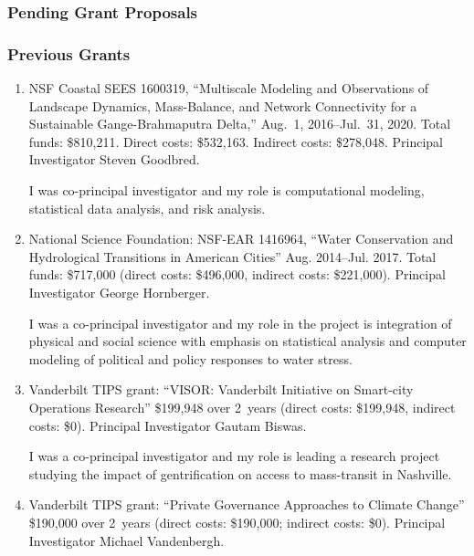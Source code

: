 \subsubsection{Pending Grant Proposals}
\begin{enumerate}
\end{enumerate}
\fi
%
\subsubsection{Previous Grants}
\begin{enumerate}
    \item NSF Coastal SEES 1600319,
    ``Multiscale Modeling and Observations of Landscape Dynamics, Mass-Balance, and Network Connectivity for a Sustainable Gange-Brahmaputra Delta,''
    Aug.~1, 2016--Jul.~31, 2020.
    Total funds: \$810,211. Direct costs: \$532,163. Indirect costs: \$278,048.
    Principal Investigator Steven Goodbred.
\begin{credit}
I was co-principal investigator and my role is computational modeling, statistical data analysis, and risk analysis.
\end{credit}
    \item National Science Foundation: NSF-EAR 1416964,
    ``Water Conservation and Hydrological Transitions in American Cities''
    Aug. 2014--Jul. 2017.
    Total funds: \$717,000 (direct costs: \$496,000, indirect costs: \$221,000).
    Principal Investigator George Hornberger.
\begin{credit}
I was a co-principal investigator and my role in the project is integration of physical and social science with emphasis on statistical analysis and
computer modeling of political and policy responses to water stress.
\end{credit}
    \item Vanderbilt TIPS grant: ``VISOR: Vanderbilt Initiative on Smart-city Operations Research'' \$199,948 over 2~years (direct costs: \$199,948, indirect costs: \$0). Principal Investigator Gautam Biswas.
\begin{credit}
I was a co-principal investigator and my role is leading a research project studying the impact of gentrification on access to mass-transit in Nashville.
\end{credit}
    \item Vanderbilt TIPS grant: ``Private Governance Approaches to Climate Change'' \$190,000 over 2~years (direct costs: \$190,000; indirect costs: \$0). Principal Investigator Michael Vandenbergh.

\end{enumerate}
